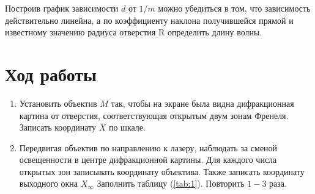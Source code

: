 \documentclass[12pt]{article}
\let\oldref\ref
\renewcommand{\ref}[1]{(\oldref{#1})}
\begin{document}
    Построив график зависимости $ d $ от $ 1/m $ можно убедиться в том, что зависимость действительно линейна, а по коэффициенту наклона получившейся прямой и известному значению радиуса отверстия R определить длину волны.

    \section*{Ход работы}

    \begin{enumerate}[wide, labelwidth=!, labelindent=0pt]
        \item Установить объектив $ M $ так, чтобы на экране была видна дифракционная картина от отверстия, соответствующая открытым двум зонам Френеля. Записать координату $ X $ по шкале.
        \item Передвигая объектив по направлению к лазеру, наблюдать за сменой освещенности в центре дифракционной картины. Для каждого числа открытых зон записывать координату объектива. Также записать координату выходного окна $ X_\infty $ Заполнить таблицу \ref{tab:1}. Повторить $ 1-3 $ раза. 
        

\end{enumerate}
\end{document}
